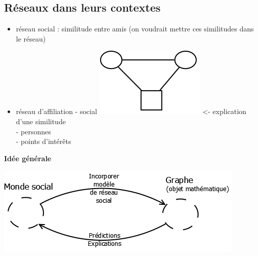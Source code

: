 \subsection{Réseaux dans leurs contextes}
\begin{itemize}
\item réseau social : similitude entre amis (on voudrait mettre ces similitudes dans le réseau)
\item réseau d'affiliation - social \includegraphics[scale=0.2]{images/Sim.png} <- explication d'une similitude \\
	- personnes \\
	- points d'intérêts 
\end{itemize}

\textbf{Idée générale}

\includegraphics[scale=0.4]{images/IdeeGenerale.png}

